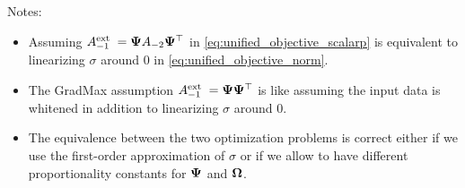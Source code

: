 \begin{theorem}
\noindent Notes:

\begin{itemize}
\item
  Assuming \(A_{- 1}^{\text{ext }} = \boldsymbol{\Psi}{}A_{- 2}\boldsymbol{\Psi}{}^{\top}\) in
  \autoref{eq:unified_objective_scalarp} is equivalent to linearizing
  \(\sigma\) around \(0\) in \autoref{eq:unified_objective_norm}.
\item
  The GradMax assumption
  \(A_{- 1}^{\text{ext }} = \boldsymbol{\Psi}{}\boldsymbol{\Psi}{}^{\top}\) is like assuming
  the input data is whitened in addition to linearizing \(\sigma\)
  around \(0\).
\item
  The equivalence between the two optimization problems is correct
  either if we use the first-order approximation of \(\sigma\) or if we
  allow to have different proportionality constants for \(\boldsymbol{\Psi}{}\) and
  \(\boldsymbol{\Omega}{}\).
\end{itemize}

\end{theorem}


